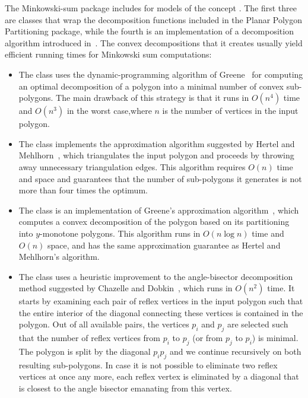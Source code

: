 The Minkowski-sum package includes for models of the concept
. The first three are classes that wrap
the decomposition functions included in the Planar Polygon Partitioning
package, while the fourth is an implementation of a decomposition algorithm
introduced in~\cite{cgal:afh-pdecm-02}. The convex decompositions that it
creates usually yield efficient running times for Minkowski sum computations:
\begin{itemize}
\item
The class  uses the
dynamic-programming algorithm of Greene~\cite{g-dpcp-83} for computing an
optimal decomposition of a polygon into a minimal number of convex
sub-polygons. The main drawback of this strategy is that it runs in $O(n^4)$
time and $O(n^3)$ in the worst case,where $n$ is the number of vertices in
the input polygon.
%
\item
The class  implements the
approximation algorithm suggested by Hertel and Mehlhorn~\cite{hm-ftsp-83},
which triangulates the input polygon and proceeds by throwing away
unnecessary triangulation edges.
This algorithm requires $O(n)$ time and space and guarantees that
the number of sub-polygons it generates is not more than four
times the optimum.
%
\item
The class  is an implementation of
Greene's approximation algorithm~\cite{g-dpcp-83}, which computes a
convex decomposition of the polygon based on its partitioning into
$y$-monotone polygons. This algorithm runs in $O(n \log n)$ time
and $O(n)$ space, and has the same approximation guarantee as
Hertel and Mehlhorn's algorithm.
%
\item
The class  uses
a heuristic improvement to the angle-bisector decomposition method
suggested by Chazelle and Dobkin~\cite{cd-ocd-85}, which runs in
$O(n^2)$ time. It starts by examining each pair of reflex vertices
in the input polygon such that the entire interior of the diagonal
connecting these vertices is contained in the polygon. Out of all
available pairs, the vertices $p_i$ and $p_j$ are selected such
that the number of reflex vertices from $p_i$ to $p_j$ (or from
$p_j$ to $p_i$) is minimal. The polygon is split by the diagonal
$p_i p_j$ and we continue recursively on both resulting
sub-polygons. In case it is not possible to eliminate two reflex
vertices at once any more, each reflex vertex is eliminated by a
diagonal that is closest to the angle bisector emanating from this
vertex.
\end{itemize}

